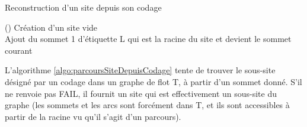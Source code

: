 \begin{algorithm}[h] %
\caption{Reconstruction d'un site depuis son codage}
\SetAlgoLined
{}
\Fn(){}{
Création d'un site vide\\
Ajout du sommet 1 d'étiquette L qui est la racine du site et devient le sommet courant\\
}
\label{algo:siteDepuisCodage}
\end{algorithm}
% 
% 
% 
L'algorithme \ref{algo:parcoursSiteDepuisCodage} tente de trouver le sous-site désigné par un codage dans un graphe de flot T, à partir d'un sommet donné. S'il ne renvoie pas FAIL, il fournit un site qui est effectivement un sous-site du graphe (les sommets et les arcs sont forcément dans T, et ils sont accessibles à partir de la racine vu qu'il s'agit d'un parcours).

